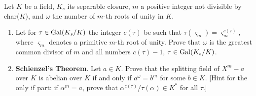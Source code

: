 \begin{ex}
	
\end{ex}






\begin{ex}
	Let $K$ be a field, $K_s$ its separable closure, $m$ a positive integer not divisible by char($K$), and $\omega$ the number of $m$-th roots of unity in $K$.
	\begin{enumerate}[label=\alph*)]
		\item Let for $\tau \in \mathrm{Gal}(K_s/K)$ the integer $c(\tau)$ be such that $\tau(\varsigma_m) = \varsigma_m^{c(\tau)}$, where $\varsigma_m$ denotes a primitive $m$-th root of unity. Prove that $\omega$ is the greatest common divisor of $m$ and all numbers $c(\tau)-1$, $\tau \in \mathrm{Gal}(K_s/K)$.

		\item \textbf{Schienzel's Theorem}. Let $a \in K$. Prove that the splitting field of $X^m -a$ over $K$ is abelian over $K$ if and only if $a^{\omega} = b^m$ for some $b \in K$. [Hint for the only if part: if $\alpha^m = a$, prove that $\alpha^{c(\tau)}/\tau(\alpha) \in K^*$ for all $\tau$.] 
	\end{enumerate}
\end{ex}

